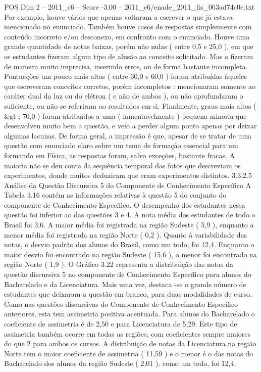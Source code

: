 \begin{textsample}{POS Dim 2 – 2011\_c6 – Score -3.00 – 2011\_c6/enade\_2011\_fis\_063ad74c0e.txt}
Por exemplo, houve vários que apenas voltaram a escrever o que já estava mencionado no enunciado.
Também houve casos de respostas simplesmente com conteúdo incorreto e/ou desconexo, em confronto com o enunciado.
Houve uma grande quantidade de notas baixas, porém não nulas ( entre 0,5 e 25,0 ), em que os estudantes fizeram algum tipo de alusão ao conceito solicitado.
Mas o fizeram de maneira muito imprecisa, inserindo erros, ou de forma bastante incompleta.
Pontuações um pouco mais altas ( entre 30,0 e 60,0 ) foram atribuídas àqueles que escreveram conceitos corretos, porém incompletos : mencionaram somente ao caráter dual da luz ou do elétron ( e não de ambos ), ou não aprofundaram o suficiente, ou não se referiram ao resultados em si.
Finalmente, graus mais altos ( \&gt ; 70,0 ) foram atribuídos a uma ( lamentavelmente ) pequena minoria que desenvolveu muito bem a questão, e veio a perder algum ponto apenas por deixar algumas lacunas.
De forma geral, a impressão é que, apesar de se tratar de uma questão com enunciado claro sobre um tema de formação essencial para um formando em Física, as respostas foram, salvo exceções, bastante fracas.
A maioria não se deu conta da sequência temporal das fotos que descreviam os experimentos, donde muitos deduziram que eram experimentos distintos. 3.3.2.5 Análise da Questão Discursiva 5 do Componente de Conhecimento Específico A Tabela 3.16 contém as informações relativas à questão 5 do conjunto do componente de Conhecimento Específico.
O desempenho dos estudantes nessa questão foi inferior ao das questões 3 e 4.
A nota média dos estudantes de todo o Brasil foi 3,6.
A maior média foi registrada na região Sudeste ( 5,9 ), enquanto a menor média foi registrada na região Norte ( 0,2 ).
Quanto à variabilidade das notas, o desvio padrão dos alunos do Brasil, como um todo, foi 12,4.
Enquanto o maior desvio foi encontrado na região Sudeste ( 15,6 ), o menor foi encontrado na região Norte ( 1,9 ).
O Gráfico 3.22 representa a distribuição das notas da questão discursiva 5 no componente de Conhecimento Específico para alunos do Bacharelado e da Licenciatura.
Mais uma vez, destaca -se o grande número de estudantes que deixaram a questão em branco, para duas modalidades de curso.
Como nas questões discursivas do Componente de Conhecimento Específico anteriores, esta tem assimetria positiva acentuada.
Para alunos do Bacharelado o coeficiente de assimetria é de 2,50 e para Licenciatura de 5,29.
Este tipo de assimetria também ocorre em todas as regiões, com coeficientes sempre maiores do que 2 para ambos os cursos.
A distribuição de notas da Licenciatura na região Norte tem o maior coeficiente de assimetria ( 11,59 ) e o menor é o das notas do Bacharelado dos alunos da região Sudeste ( 2,01 ). como um todo, foi 12,4.

\end{textsample}
